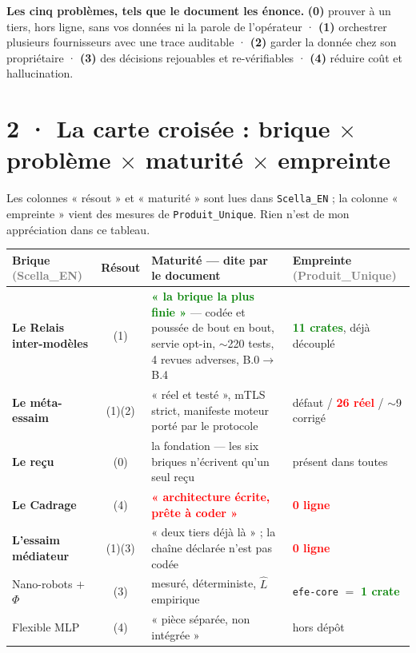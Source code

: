 \documentclass[10pt]{article}
\newcommand{\best}[1]{\textcolor{green}{\textbf{#1}}}
\newcommand{\pire}[1]{\textcolor{red}{\textbf{#1}}}
\newcommand{\sz}[1]{\textcolor{grey}{\small\textsf{#1}}}
\newcommand{\code}[1]{\texttt{\small #1}}
\newcommand{\x}{$\times$}
\begin{document}
\begin{extrait}
\textbf{Les cinq problèmes, tels que le document les énonce.}
\textbf{(0)} prouver à un tiers, hors ligne, sans vos données ni la parole de l'opérateur ·
\textbf{(1)} orchestrer plusieurs fournisseurs avec une trace auditable ·
\textbf{(2)} garder la donnée chez son propriétaire ·
\textbf{(3)} des décisions rejouables et re-vérifiables ·
\textbf{(4)} réduire coût et hallucination.
\end{extrait}

\section{2 · La carte croisée : brique \x{} problème \x{} maturité \x{} empreinte}

Les colonnes « résout » et « maturité » sont lues dans \code{Scella\_EN} ; la colonne « empreinte »
vient des mesures de \code{Produit\_Unique}. Rien n'est de mon appréciation dans ce tableau.

\renewcommand{\arraystretch}{1.22}
\begin{center}\small
\begin{tabular}{@{}>{\raggedright\arraybackslash}p{3.5cm} c >{\raggedright\arraybackslash}p{7.0cm} >{\raggedright\arraybackslash}p{3.7cm}@{}}
\toprule
\textbf{Brique} \sz{(Scella\_EN)} & \textbf{Résout} & \textbf{Maturité --- dite par le document} & \textbf{Empreinte} \sz{(Produit\_Unique)} \\
\midrule
\textbf{Le Relais inter-modèles} & (1) & \best{« la brique la plus finie »} --- codée et poussée de bout en bout, servie opt-in, $\sim$220 tests, 4 revues adverses, B.0$\rightarrow$B.4 & \best{11 crates}, déjà découplé \\
\textbf{Le méta-essaim} & (1)(2) & « réel et testé », mTLS strict, manifeste moteur porté par le protocole & 7 défaut / \pire{26 réel} / $\sim$9 corrigé \\
\textbf{Le reçu} & (0) & la fondation --- les six briques n'écrivent qu'un seul reçu & présent dans toutes \\
\textbf{Le Cadrage} & (4) & \pire{« architecture écrite, prête à coder »} & \pire{0 ligne} \\
\textbf{L'essaim médiateur} & (1)(3) & « deux tiers déjà là » ; la chaîne déclarée n'est pas codée & \pire{0 ligne} \\
Nano-robots $+$ $\Phi$ & (3) & mesuré, déterministe, $\hat{L}$ empirique & \code{efe-core} $=$ \best{1 crate} \\
Flexible MLP & (4) & « pièce séparée, non intégrée » & hors dépôt \\
\bottomrule
\end{tabular}
\end{center}
\end{document}
